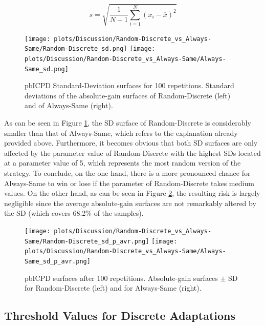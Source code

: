\documentclass[11pt]{article}
\begin{document}
	\begin{equation}
		s = \sqrt{\frac{1}{N-1} \sum_{i=1}^N (x_i - \overline{x})^2}
		\label{eq:standard_deviation}
	\end{equation}

	\begin{figure}[htbp]
		\centering
		\texttt{[image: plots/Discussion/Random-Discrete\_vs\_Always-Same/Random-Discrete\_sd.png]}
		\texttt{[image: plots/Discussion/Random-Discrete\_vs\_Always-Same/Always-Same\_sd.png]}
		\caption{pbICPD Standard-Deviation surfaces for 100 repetitions. Standard deviations of the absolute-gain surfaces of Random-Discrete (left) and of Always-Same (right).}
		\label{fig:two_one-iter_sd}
	\end{figure}

	\noindent
	As can be seen in Figure \ref{fig:two_one-iter_sd}, the SD surface of Random-Discrete is considerably smaller than that of Always-Same, which refers to the explanation already provided above.
	Furthermore, it becomes obvious that both SD surfaces are only affected by the parameter value of Random-Discrete with the highest SDs located at a parameter value of 5, which represents the most random version of the strategy. 
	To conclude, on the one hand, there is a more pronounced chance for Always-Same to win or lose if the parameter of Random-Discrete takes medium values.
	On the other hand, as can be seen in Figure \ref{fig:SD_avr}, the resulting risk is largely negligible since the average absolute-gain surfaces are not remarkably altered by the SD (which covers 68.2\% of the samples).

	\begin{figure}[h]
		\centering
		\texttt{[image: plots/Discussion/Random-Discrete\_vs\_Always-Same/Random-Discrete\_sd\_p\_avr.png]}
		\texttt{[image: plots/Discussion/Random-Discrete\_vs\_Always-Same/Always-Same\_sd\_p\_avr.png]}
		\caption{pbICPD surfaces after 100 repetitions. Absolute-gain surfaces $\pm$ SD for Random-Discrete (left) and for Always-Same (right).}
		\label{fig:SD_avr}
	\end{figure}

\subsection{Threshold Values for Discrete Adaptations} \label{sec:threshold_values}
		
\end{document}
